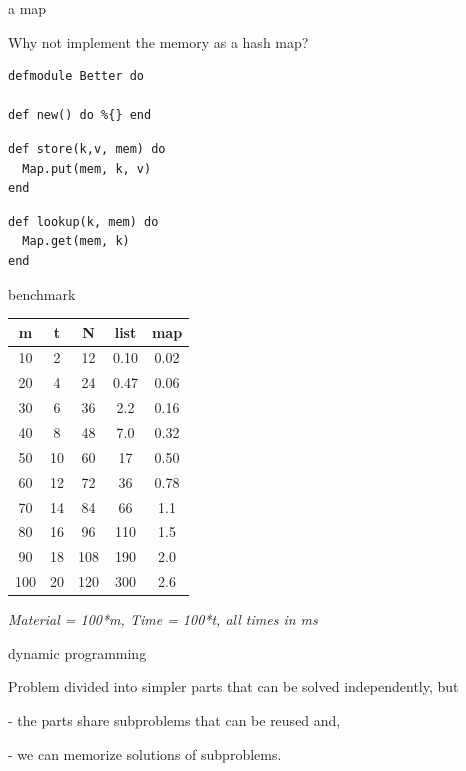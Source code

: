 \begin{frame}[fragile]{a map}

Why not implement the memory as a hash map? 

\vspace{10pt}
\begin{verbatim}
defmodule Better do

def new() do %{} end
\end{verbatim}
\pause
\begin{verbatim}    
def store(k,v, mem) do 
  Map.put(mem, k, v)
end
\end{verbatim}
\pause
\begin{verbatim}        
def lookup(k, mem) do
  Map.get(mem, k)
end
\end{verbatim}

\end{frame}

\begin{frame}{benchmark}


\hspace{100pt}\begin{tabular}{|c|c|c|c|c|}
\hline 
       m & t & N & list & map\\
\hline
        10&          2&         12&        0.10&     0.02\\
        20&          4&         24&        0.47&     0.06\\
        30&          6&         36&        2.2&      0.16\\
        40&          8&         48&        7.0&      0.32\\
        50&         10&         60&       17&        0.50\\
        60&         12&         72&       36&        0.78\\
        70&         14&         84&       66&        1.1\\
        80&         16&         96&      110&        1.5\\
        90&         18&        108&      190&        2.0\\
       100&         20&        120&      300&        2.6\\
\hline
\end{tabular}

\vspace{10pt}
{\em Material = 100*m, Time = 100*t, all times in ms}

\end{frame}

\begin{frame}{dynamic programming}

\vspace{40pt}\hspace{80pt}\parbox[l][60pt][l]{240pt}{Problem divided into simpler parts that can be solved independently, but 

\vspace{10pt}\pause
-  the parts share subproblems that can be reused and,

\vspace{10pt}\pause
-  we can memorize solutions of subproblems.
}



\end{frame}


